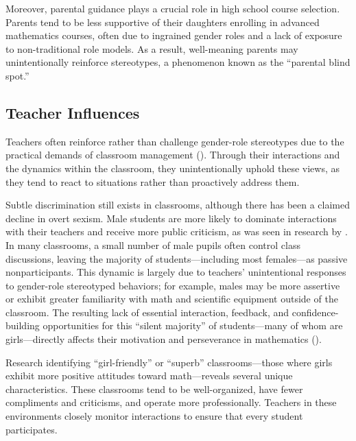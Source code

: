 Moreover, parental guidance plays a crucial role in high school course selection. Parents tend to be less supportive of their daughters enrolling in advanced mathematics courses, often due to ingrained gender roles and a lack of exposure to non-traditional role models. As a result, well-meaning parents may unintentionally reinforce stereotypes, a phenomenon known as the ``parental blind spot.''

\subsection{Teacher Influences}
Teachers often reinforce rather than challenge gender-role stereotypes due to the practical demands of classroom management (\cite{Gunderson2012}). Through their interactions and the dynamics within the classroom, they unintentionally uphold these views, as they tend to react to situations rather than proactively address them. 

Subtle discrimination still exists in classrooms, although there has been a claimed decline in overt sexism. Male students are more likely to dominate interactions with their teachers and receive more public criticism, as was seen in research by \textcite{VanLooRydell2014}. In many classrooms, a small number of male pupils often control class discussions, leaving the majority of students—including most females—as passive nonparticipants. This dynamic is largely due to teachers' unintentional responses to gender-role stereotyped behaviors; for example, males may be more assertive or exhibit greater familiarity with math and scientific equipment outside of the classroom. The resulting lack of essential interaction, feedback, and confidence-building opportunities for this ``silent majority'' of students—many of whom are girls—directly affects their motivation and perseverance in mathematics (\cite{Smith22}).

Research identifying ``girl-friendly'' or ``superb'' classrooms—those where girls exhibit more positive attitudes toward math—reveals several unique characteristics. These classrooms tend to be well-organized, have fewer compliments and criticisms, and operate more professionally. Teachers in these environments closely monitor interactions to ensure that every student participates. 

